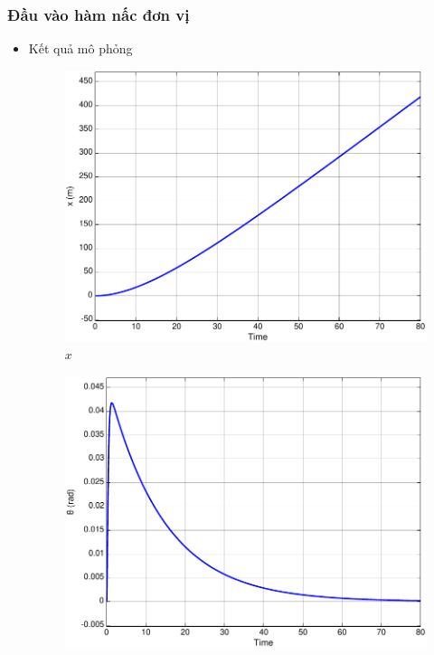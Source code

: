\documentclass[12pt,a4paper]{article}
\begin{document}
\subsubsection{Đầu vào hàm nấc đơn vị}
\begin{itemize}
    \item Kết quả mô phỏng 
    
    {
        \captionsetup{type=figure}
        \centering
        \begin{subfigure}[b]{0.495\linewidth}
            \centering
            \includegraphics[width=\linewidth]{phan_tich_x_step.pdf}
            \caption{$x$}
        \end{subfigure}\hfill
        \begin{subfigure}[b]{0.495\linewidth}
            \centering
            \includegraphics[width=\linewidth]{phan_tich_theta_step.pdf}

\end{subfigure}}
\end{itemize}
\end{document}

